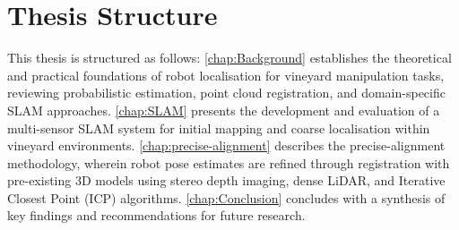 \section{Thesis Structure}
\label{sec:thesis-structure}

This thesis is structured as follows:
\cref{chap:Background} establishes the theoretical and practical foundations of robot localisation for vineyard manipulation tasks, reviewing probabilistic estimation, point cloud registration, and domain-specific SLAM approaches.
\cref{chap:SLAM} presents the development and evaluation of a multi-sensor SLAM system for initial mapping and coarse localisation within vineyard environments. 
\cref{chap:precise-alignment} describes the precise-alignment methodology, wherein robot pose estimates are refined through registration with pre-existing 3D models using stereo depth imaging, dense LiDAR, and Iterative Closest Point (ICP) algorithms. 
\cref{chap:Conclusion} concludes with a synthesis of key findings and recommendations for future research.

